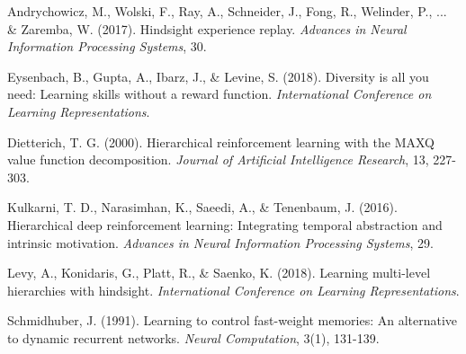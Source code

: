 \documentclass[12pt]{article}
\begin{document}
{{\begin{thebibliography}{9}
Andrychowicz, M., Wolski, F., Ray, A., Schneider, J., Fong, R., Welinder, P., ... \& Zaremba, W. (2017). Hindsight experience replay. \textit{Advances in Neural Information Processing Systems}, 30.

Eysenbach, B., Gupta, A., Ibarz, J., \& Levine, S. (2018). Diversity is all you need: Learning skills without a reward function. \textit{International Conference on Learning Representations}.

Dietterich, T. G. (2000). Hierarchical reinforcement learning with the MAXQ value function decomposition. \textit{Journal of Artificial Intelligence Research}, 13, 227-303.

Kulkarni, T. D., Narasimhan, K., Saeedi, A., \& Tenenbaum, J. (2016). Hierarchical deep reinforcement learning: Integrating temporal abstraction and intrinsic motivation. \textit{Advances in Neural Information Processing Systems}, 29.

Levy, A., Konidaris, G., Platt, R., \& Saenko, K. (2018). Learning multi-level hierarchies with hindsight. \textit{International Conference on Learning Representations}.

Schmidhuber, J. (1991). Learning to control fast-weight memories: An alternative to dynamic recurrent networks. \textit{Neural Computation}, 3(1), 131-139.

\end{thebibliography}

}}

\end{document}
